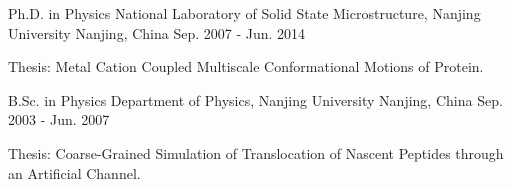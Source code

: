 

\begin{cventries}

  \cventry
  {Ph.D. in Physics} %
  {National Laboratory of Solid State Microstructure, Nanjing University} %
  {Nanjing, China} %
  {Sep. 2007 - Jun. 2014} %
  {
    \begin{cvitems} %
    \item {Thesis: Metal Cation Coupled Multiscale Conformational Motions of Protein.}
    \end{cvitems}
  }

  \cventry
  {B.Sc. in Physics} %
  {Department of Physics, Nanjing University} %
  {Nanjing, China} %
  {Sep. 2003 - Jun. 2007} %
  {
    \begin{cvitems} %
    \item {Thesis: Coarse-Grained Simulation of Translocation of Nascent Peptides through an Artificial Channel.}
    \end{cvitems}
  }

\end{cventries}
